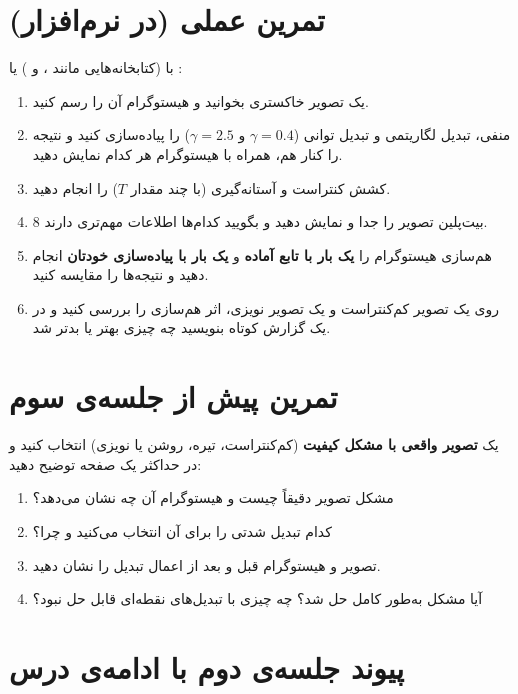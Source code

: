 \documentclass[11pt,a4paper]{article}
\begin{document}
	
	\section{تمرین عملی (در نرم‌افزار)}
	
	با  (کتابخانه‌هایی مانند ،  و ) یا :
	
	\begin{enumerate}
		\item یک تصویر خاکستری بخوانید و هیستوگرام آن را رسم کنید.
		\item منفی، تبدیل لگاریتمی و تبدیل توانی ($\gamma=0.4$ و $\gamma=2.5$) را پیاده‌سازی کنید
		و نتیجه را کنار هم، همراه با هیستوگرام هر کدام نمایش دهید.
		\item کشش کنتراست و آستانه‌گیری (با چند مقدار $T$) را انجام دهید.
		\item $8$ بیت‌پلین تصویر را جدا و نمایش دهید و بگویید کدام‌ها اطلاعات مهم‌تری دارند.
		\item هم‌سازی هیستوگرام را \textbf{یک بار با تابع آماده} و \textbf{یک بار با پیاده‌سازی خودتان}
		انجام دهید و نتیجه‌ها را مقایسه کنید.
		\item روی یک تصویر کم‌کنتراست و یک تصویر نویزی، اثر هم‌سازی را بررسی کنید و در یک گزارش کوتاه بنویسید
		چه چیزی بهتر یا بدتر شد.
	\end{enumerate}
	
	
	\section{تمرین پیش از جلسه‌ی سوم}
	
	یک \textbf{تصویر واقعی با مشکل کیفیت} (کم‌کنتراست، تیره، روشن یا نویزی) انتخاب کنید
	و در حداکثر یک صفحه توضیح دهید:
	
	\begin{enumerate}
		\item مشکل تصویر دقیقاً چیست و هیستوگرام آن چه نشان می‌دهد؟
		\item کدام تبدیل شدتی را برای آن انتخاب می‌کنید و چرا؟
		\item تصویر و هیستوگرام قبل و بعد از اعمال تبدیل را نشان دهید.
		\item آیا مشکل به‌طور کامل حل شد؟ چه چیزی با تبدیل‌های نقطه‌ای قابل حل نبود؟
	\end{enumerate}
	
	
	\section{پیوند جلسه‌ی دوم با ادامه‌ی درس}
	
\end{document}
